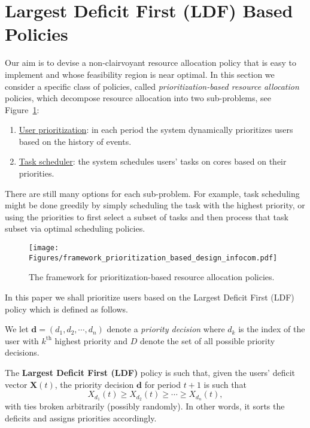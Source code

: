 \documentclass[prodmode,acmtompecs]{acmsmall}
\newcommand{\myComments}[1]{}
\newif\ifdissertation
\newcommand{\dissertationStart}{\ifdissertation  \myComments{Dissertation version: }}
\newcommand{\commentEnd}{\myComments{End}}
\begin{document}
\section{Largest Deficit First (LDF) Based Policies}
Our aim is to devise a non-clairvoyant resource allocation policy that is easy to implement and whose feasibility region is near optimal. 
In this section we consider a specific class of policies, called {\em prioritization-based resource allocation} policies, which decompose resource allocation into two sub-problems, see Figure~{\ref{fig_prioritization_based_framework}}: 
\begin{enumerate}
\item \underline{User prioritization}: in each period the system dynamically prioritizes users based on the history of events. 
\item \underline{Task scheduler}: the system schedules users' tasks on cores based on their priorities. 
\end{enumerate}
There are still many options for each sub-problem. 
For example, task scheduling might be done greedily by simply scheduling the task with the highest priority, or using the priorities to first select a subset of tasks and then process that task subset via optimal scheduling policies. 

\begin{figure}[htp]
  \centering
  \texttt{[image: Figures/framework\_prioritization\_based\_design\_infocom.pdf]}
  \caption{The framework for prioritization-based resource allocation policies. }
  \label{fig_prioritization_based_framework}
\end{figure}

In this paper we shall prioritize users based on the Largest Deficit First (LDF) policy which is defined as follows. 

We let $\mathbf{d}=(d_1, d_2, \cdots, d_n)$ denote a {\em priority decision} where $d_k$ is the index of the user with $k^{\text{th}}$ highest priority and $D$ denote the set of all possible priority decisions.
\dissertationStart
and let $|D|$ be the number of possible decisions. We shall assume no restrictions on the set of allowable priority decisions, so $|D| = n!$
\commentEnd\fi

\begin{definition}
\label{defn_w_LDF}
The {\bf Largest Deficit First (LDF)} policy is such that, given the users' deficit vector $\mathbf{X}(t)$, the priority decision $\mathbf{d}$ for period $t+1$ is such that
$$
X_{d_1}(t) \geq X_{d_2}(t) \geq \cdots \geq X_{d_n}(t),
$$
with ties broken arbitrarily (possibly randomly). In other words, it sorts the deficits and assigns priorities accordingly. 
\end{definition}
\end{document}
